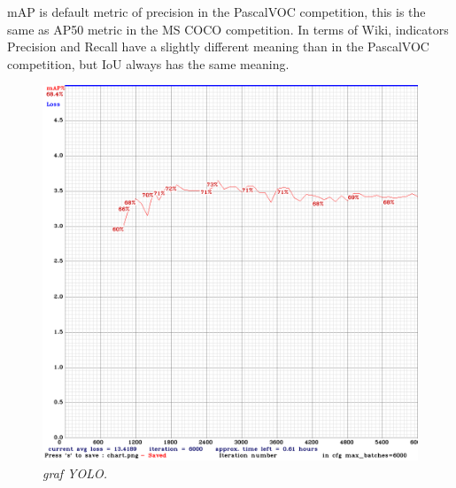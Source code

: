 mAP is default metric of precision in the PascalVOC competition, this is the same as AP50 metric in the MS COCO competition. In terms of Wiki, indicators Precision and Recall have a slightly different meaning than in the PascalVOC competition, but IoU always has the same meaning.

\begin{figure}[h!]
\begin{center} 
\includegraphics[scale=0.35]{figures/chart_yolo-obj.png}
\caption{\small \sl graf YOLO. \label{fig:chart_yolo}}
\end{center}
\end{figure}
